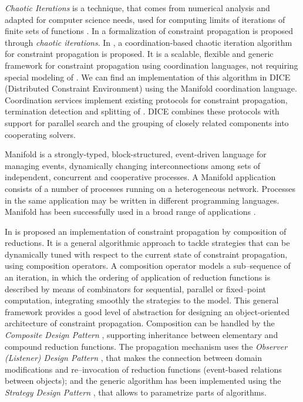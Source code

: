 \textit{Chaotic Iterations} is a technique, that comes from numerical analysis and adapted for computer science needs, used for computing limits of iterations of finite sets of functions \cite{Chazan1969, Cousot1977}. In \cite{Apt,Monfroy} a formalization of constraint propagation is proposed through {\it chaotic iterations}. In \cite{Monfroy2000}, a coordination-based chaotic iteration algorithm for constraint propagation is proposed. It is a scalable, flexible and generic framework for constraint propagation using coordination languages, not requiring special modeling of \csps. We can find an implementation of this algorithm in {\sc DICE} (Distributed Constraint Environment) \cite{Zoeteweij2003} using the {\sc Manifold} coordination language. Coordination services implement existing protocols for constraint propagation, termination detection and splitting of \csps. {\sc DICE} combines these protocols with support for parallel search and the grouping of closely related components into cooperating solvers.

{\sc Manifold} is a strongly-typed, block-structured, event-driven language for managing events, dynamically changing interconnections among sets of independent, concurrent and cooperative processes. A {\sc Manifold} application consists of a number of processes running on a heterogeneous network. Processes in the same application may be written in different programming languages. {\sc Manifold} has been successfully used in a broad range of applications \cite{Arbab1995}.

In \cite{Granvilliers2001} is proposed an implementation of constraint propagation by composition of reductions. It is a general algorithmic approach to tackle strategies that can be dynamically tuned with respect to the current state of constraint propagation, using composition operators. A composition operator models a sub--sequence of an iteration, in which the ordering of application of reduction functions is described by means of combinators for sequential, parallel or fixed--point computation, integrating smoothly the strategies to the model. This general framework provides a good level of abstraction for designing an object-oriented architecture of constraint propagation. Composition can be handled by the {\it Composite Design Pattern} \cite{DP_Composite}, supporting inheritance between elementary and compound reduction functions. The propagation mechanism uses the {\it Observer (Listener) Design Pattern} \cite{DP_Observer}, that makes the connection between domain modifications and re--invocation of reduction functions (event-based relations between objects); and the generic algorithm has been implemented using the {\it Strategy Design Pattern} \cite{DP_Strategy}, that allows to parametrize parts of algorithms.


